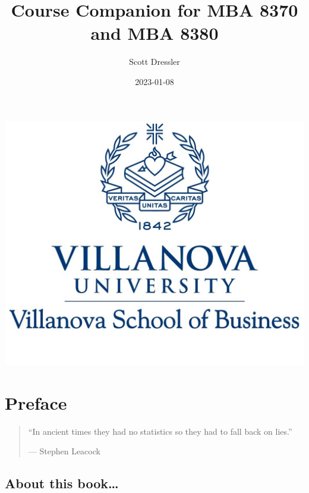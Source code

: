 \documentclass[
]{book}
\title{Course Companion for MBA 8370 and MBA 8380}
\author{Scott Dressler}
\date{2023-01-08}
\begin{document}
\maketitle

{
\setcounter{tocdepth}{1}
\tableofcontents
}
\hypertarget{section}{%
\chapter*{}\label{section}}

\begin{center}\includegraphics[width=14.36in]{images/VU17BLUE3} \end{center}

\hypertarget{preface}{%
\chapter*{Preface}\label{preface}}

\begin{quote}
``In ancient times they had no statistics so they had to fall back on lies.''

--- Stephen Leacock
\end{quote}

\hypertarget{about-this-book}{%
\section*{About this book\ldots{}}\label{about-this-book}}
\end{document}
